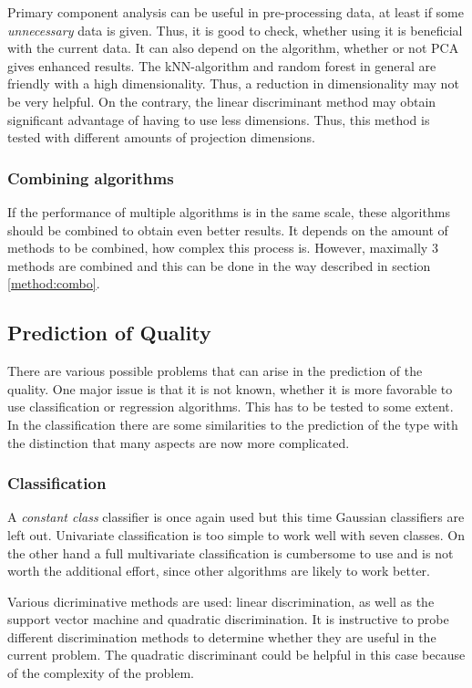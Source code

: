 \documentclass[twoside]{article}
\begin{document}
\begin{multicols}{2}
Primary component analysis can be useful in pre-processing data, at least if some \emph{unnecessary} data is given. Thus, it is good to check, whether
using it is beneficial with the current data. It can also depend on the algorithm, whether or not PCA gives enhanced results. The kNN-algorithm and random
forest in general are friendly with a high dimensionality. Thus, a reduction in dimensionality may not be very helpful. On the contrary, the linear discriminant
method may obtain significant advantage of having to use less dimensions. Thus, this method is tested with different amounts of projection dimensions.

\subsubsection{Combining algorithms}

If the performance of multiple algorithms is in the same scale, these algorithms should be combined to obtain even better results. It depends on the amount
of methods to be combined, how complex this process is. However, maximally 3 methods are combined and this can be done in the way described in section \ref{method:combo}.

\subsection{Prediction of Quality}

There are various possible problems that can arise in the prediction of the quality. One major issue is that it is
not known, whether it is more favorable to use classification or regression algorithms. This has to be tested
to some extent. In the classification there are some similarities to the 
prediction of the type with the distinction that many aspects are now more complicated.

\subsubsection{Classification}

A \emph{constant class} classifier is once again used but this time Gaussian classifiers are left out. 
Univariate classification is too simple to work well with seven classes.
On the other hand a full multivariate classification is cumbersome to use and is not worth the 
additional effort, since other algorithms are likely to work better.

Various dicriminative methods are used: linear discrimination, as well as the support vector machine and quadratic discrimination. 
It is instructive to probe different discrimination methods to determine whether they are useful in the current problem. 
The quadratic discriminant could be helpful in this case because of the complexity of the problem.


\end{multicols}
\end{document}
